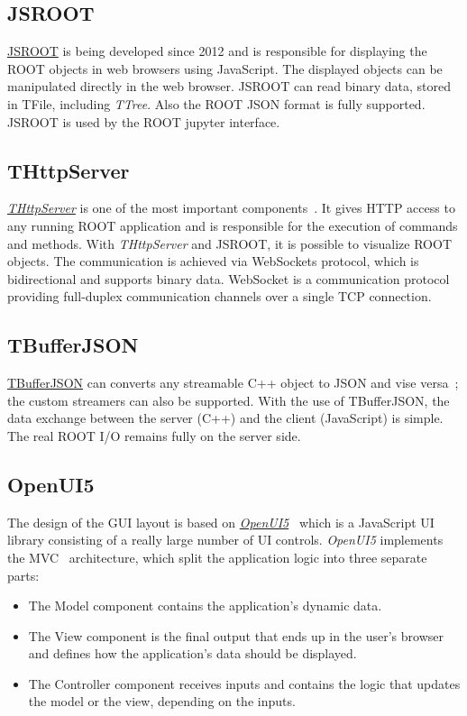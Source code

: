 \documentclass[a4paper]{jpconf}
\begin{document}
\subsection{JSROOT}

\href{https://github.com/root-project/jsroot/}{JSROOT} is being developed since
2012 and is responsible for displaying the ROOT objects in web browsers using
JavaScript. The displayed objects can be manipulated directly in
the web browser. JSROOT can read binary data, stored in TFile, including \textit{TTree}.
Also the ROOT JSON format is fully supported. JSROOT is used by the ROOT jupyter interface.

\subsection{THttpServer}

\href{https://github.com/root-project/jsroot/blob/master/docs/HttpServer.md}{{\it THttpServer}} is
one of the most important components~\cite{http}. It gives HTTP access to any running ROOT application
and is responsible for the execution of commands and methods. With {\it THttpServer}
and JSROOT, it is possible to visualize ROOT objects. The communication is achieved
via WebSockets protocol, which is bidirectional and supports binary data. WebSocket
is a communication protocol providing full-duplex communication channels over a
single TCP connection.

\subsection{TBufferJSON}

\href{https://root.cern.ch/doc/master/classTBufferJSON.html}{TBufferJSON} can converts
any streamable C++ object to JSON and vise versa~\cite{buffer}; the custom streamers
can also be supported. With the use of TBufferJSON, the data exchange between the server (C++)
and the client (JavaScript) is simple. The real ROOT I/O remains fully on the server side.

\subsection{OpenUI5}
The design of the GUI layout is based on \textit{\href{https://openui5.hana.ondemand.com/}{OpenUI5}}~\cite{openui}
which is a JavaScript UI library consisting of a really large number of UI controls.
\textit{OpenUI5} implements the MVC~\cite{mvc} architecture, which split
the application logic into three separate parts:
\begin{itemize}
  \item The Model component contains the application's dynamic data.
  \item The View component is the final output that ends up in the user's browser and defines how the application's data should be displayed.
  \item The Controller component receives inputs and contains the logic that updates the model or the view, depending on the inputs.
\end{itemize}
\end{document}
